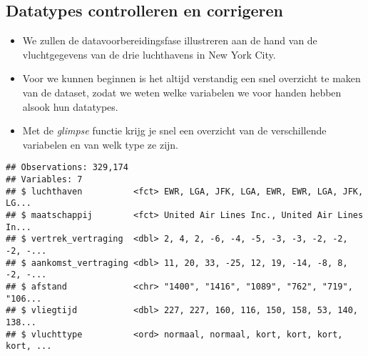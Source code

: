 \documentclass[]{memoir}
\providecommand{\tightlist}{%
  \setlength{\itemsep}{0pt}\setlength{\parskip}{0pt}}
\begin{document}
\hypertarget{datatypes-controlleren-en-corrigeren}{%
\subsection{Datatypes controlleren en corrigeren}\label{datatypes-controlleren-en-corrigeren}}

\begin{itemize}
\tightlist
\item
  We zullen de datavoorbereidingsfase illustreren aan de hand van de vluchtgegevens van de drie luchthavens in New York City.
\item
  Voor we kunnen beginnen is het altijd verstandig een snel overzicht te maken van de dataset, zodat we weten welke variabelen we voor handen hebben alsook hun datatypes.
\item
  Met de \emph{glimpse} functie krijg je snel een overzicht van de verschillende variabelen en van welk type ze zijn.
\end{itemize}

\begin{verbatim}
## Observations: 329,174
## Variables: 7
## $ luchthaven          <fct> EWR, LGA, JFK, LGA, EWR, EWR, LGA, JFK, LG...
## $ maatschappij        <fct> United Air Lines Inc., United Air Lines In...
## $ vertrek_vertraging  <dbl> 2, 4, 2, -6, -4, -5, -3, -3, -2, -2, -2, -...
## $ aankomst_vertraging <dbl> 11, 20, 33, -25, 12, 19, -14, -8, 8, -2, -...
## $ afstand             <chr> "1400", "1416", "1089", "762", "719", "106...
## $ vliegtijd           <dbl> 227, 227, 160, 116, 150, 158, 53, 140, 138...
## $ vluchttype          <ord> normaal, normaal, kort, kort, kort, kort, ...
\end{verbatim}
\end{document}
